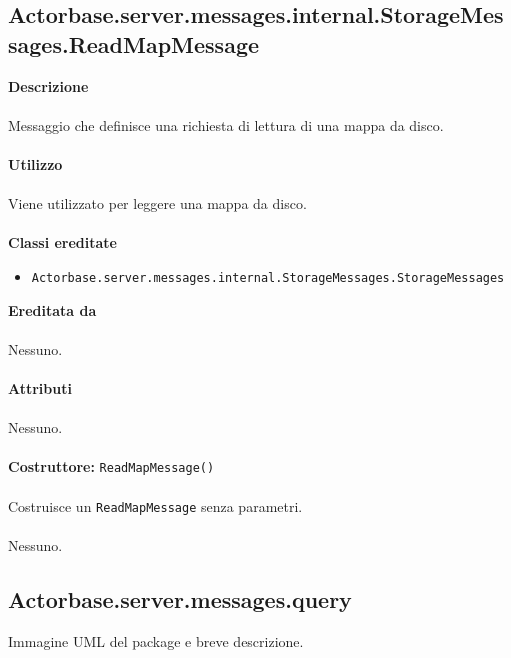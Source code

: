 \documentclass[a4paper]{article}
\begin{document}
	\subsection{Actorbase.server.messages.internal.StorageMessages.ReadMapMessage}
		\textbf{Descrizione}
			\\ \\
			Messaggio che definisce una richiesta di lettura di una mappa da disco.
			\\ \\
		\textbf{Utilizzo}
			\\ \\
			Viene utilizzato per leggere una mappa da disco.
			\\ \\
		\textbf{Classi ereditate}
			\begin{itemize}
				\item \texttt{Actorbase.server.messages.internal.StorageMessages.StorageMessages}
			\end{itemize}
		\textbf{Ereditata da}
			\\ \\
			Nessuno.
			\\ \\
		\textbf{Attributi}
			\\ \\
			Nessuno.
			\\ \\
		\textbf{Costruttore:} \texttt{ReadMapMessage()}
		\\ \\
		Costruisce un \texttt{ReadMapMessage} senza parametri.
		\\ \\
		Nessuno.
			
	\subsection{Actorbase.server.messages.query}
		Immagine UML del package e breve descrizione.
		
\end{document}
